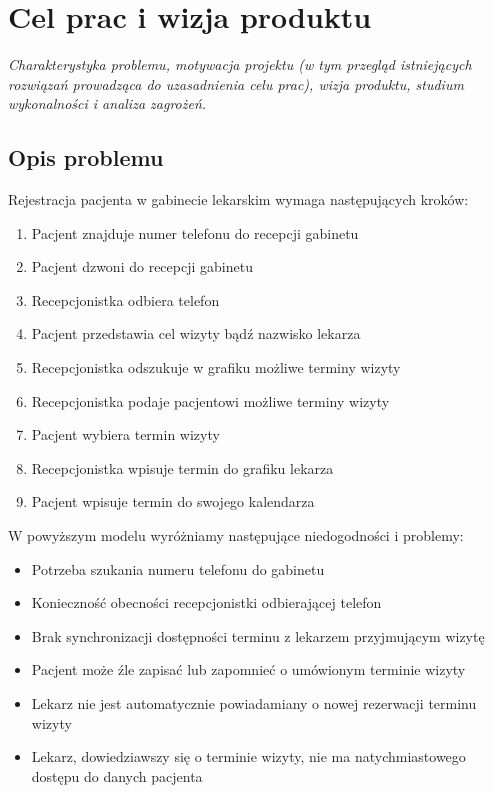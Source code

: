 \documentclass[polish,12pt]{aghthesis}
\author{Wojciech Karpiel\\ Michał Hamuda\\ Filip Galas}
\date{2017}
\begin{document}
\maketitle

\tableofcontents

\section{Cel prac i wizja produktu}
\label{sec:cel-wizja}
\emph{Charakterystyka problemu, motywacja projektu (w tym przegląd
  istniejących rozwiązań prowadząca do uzasadnienia celu prac),
  wizja produktu, studium wykonalności i analiza zagrożeń.}
  
\subsection{Opis problemu}
Rejestracja pacjenta w gabinecie lekarskim wymaga następujących kroków:

\begin{enumerate}
  \item Pacjent znajduje numer telefonu do recepcji gabinetu
  \item Pacjent dzwoni do recepcji gabinetu
  \item Recepcjonistka odbiera telefon
  \item Pacjent przedstawia cel wizyty bądź nazwisko lekarza
  \item Recepcjonistka odszukuje w grafiku możliwe terminy wizyty
  \item Recepcjonistka podaje pacjentowi możliwe terminy wizyty
  \item Pacjent wybiera termin wizyty
  \item Recepcjonistka wpisuje termin do grafiku lekarza
  \item Pacjent wpisuje termin do swojego kalendarza
\end{enumerate}

W powyższym modelu wyróżniamy następujące niedogodności i problemy:

\begin{itemize}
  \item Potrzeba szukania numeru telefonu do gabinetu
  \item Konieczność obecności recepcjonistki odbierającej telefon
  \item Brak synchronizacji dostępności terminu z lekarzem przyjmującym wizytę
  \item Pacjent może źle zapisać lub zapomnieć o umówionym terminie wizyty
  \item Lekarz nie jest automatycznie powiadamiany o nowej rezerwacji terminu wizyty
  \item Lekarz, dowiedziawszy się o terminie wizyty, nie ma natychmiastowego dostępu do danych pacjenta
\end{itemize}
\end{document}
